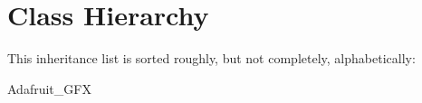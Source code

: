 \section{Class Hierarchy}
This inheritance list is sorted roughly, but not completely, alphabetically\+:\begin{DoxyCompactList}
\item Adafruit\+\_\+\+G\+FX\begin{DoxyCompactList}
\item {}
\end{DoxyCompactList}
\item {}
\item {}
\end{DoxyCompactList}
